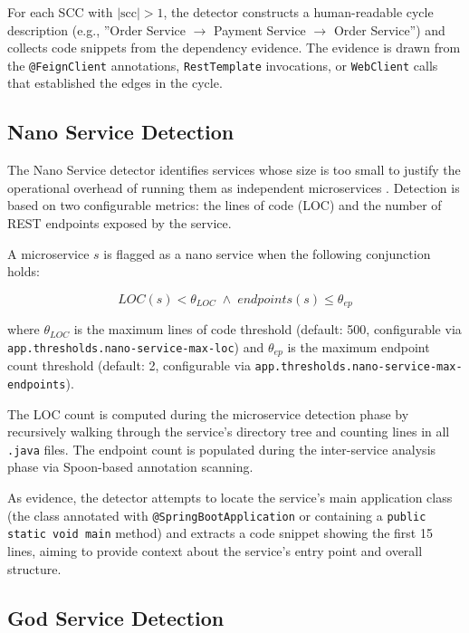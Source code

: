 For each SCC with $|\text{scc}| > 1$, the detector constructs a human-readable cycle description (e.g., ''Order Service $\to$ Payment Service $\to$ Order Service'') and collects code snippets from the dependency evidence. The evidence is drawn from the \texttt{@FeignClient} annotations, \texttt{RestTemplate} invocations, or \texttt{WebClient} calls that established the edges in the cycle.

\subsection{Nano Service Detection}
\label{subsec:detect-nano-service}

\par The Nano Service detector identifies services whose size is too small to justify the operational overhead of running them as independent microservices \cite{Tighilt2023}. Detection is based on two configurable metrics: the lines of code (LOC) and the number of REST endpoints exposed by the service.

A microservice $s$ is flagged as a nano service when the following conjunction holds:

\begin{equation}
    \mathit{LOC}(s) < \theta_{\mathit{LOC}} \;\wedge\; \mathit{endpoints}(s) \leq \theta_{\mathit{ep}}
    \label{eq:nano-service-detection}
\end{equation}

\noindent where $\theta_{\mathit{LOC}}$ is the maximum lines of code threshold (default: 500, configurable via \texttt{app.\-thresh\-olds.\-nano-service\--max\--loc}) and $\theta_{\mathit{ep}}$ is the maximum endpoint count threshold (default: 2, configurable via \texttt{app.thresholds.nano-service\--max-endpoints}).

The LOC count is computed during the microservice detection phase by recursively walking through the service's directory tree and counting lines in all \texttt{.java} files. The endpoint count is populated during the inter-service analysis phase via Spoon-based annotation scanning.

As evidence, the detector attempts to locate the service's main application class (the class annotated with \texttt{@SpringBootApplication} or containing a \texttt{public static void main} method) and extracts a code snippet showing the first 15 lines, aiming to provide context about the service's entry point and overall structure.

\subsection{God Service Detection}
\label{subsec:detect-god-service}

